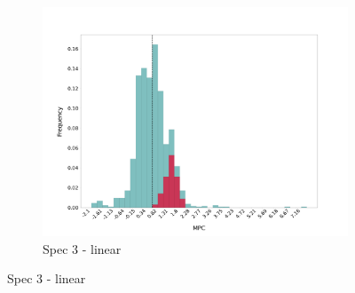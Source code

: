 \begin{figure}[t]
\begin{subfigure}{0.33\linewidth}
        \includegraphics[width=\linewidth]{figures/distributions/spec3_lin_chTOTexp.png}
        \caption{Spec 3 - linear}
    \end{subfigure}\hfill
    

\end{figure}
